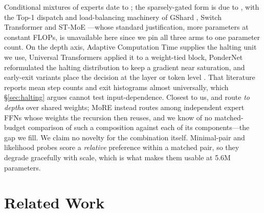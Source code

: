 Conditional mixtures of experts date to \citet{jacobs1991moe}; the sparsely-gated
form is due to \citet{shazeer2017moe}, with the Top-1 dispatch and load-balancing
machinery of GShard \citep{lepikhin2021gshard}, Switch Transformer
\citep{fedus2022switch} and ST-MoE \citep{zoph2022stmoe}---whose standard
justification, more parameters at constant FLOPs, is unavailable here since we
pin all three arms to one parameter count. On the depth axis, Adaptive
Computation Time \citep{graves2016act} supplies the halting unit we use,
Universal Transformers \citep{dehghani2019ut} applied it to a weight-tied block,
PonderNet \citep{banino2021pondernet} reformulated the halting distribution to
keep a gradient near saturation, and early-exit variants place the decision at
the layer or token level \citep{elbayad2020depthadaptive,schuster2022calm,raposo2024mod}.
That literature reports mean step counts and exit histograms almost universally,
which \S\ref{sec:halting} argues cannot test input-dependence. Closest to us,
\citet{bae2025mor} and \citet{raposo2024mod} route \emph{to depths} over shared
weights; MoRE instead routes among independent expert FFNs whose weights the
recursion then reuses, and we know of no matched-budget comparison of such a
composition against each of its components---the gap we fill. We claim no novelty
for the combination itself. Minimal-pair and likelihood probes
\citep{warstadt2020blimp,ivanova2024ewok} score a \emph{relative} preference
within a matched pair, so they degrade gracefully with scale, which is what makes
them usable at 5.6M parameters.
\section{Related Work}
\label{sec:related}


